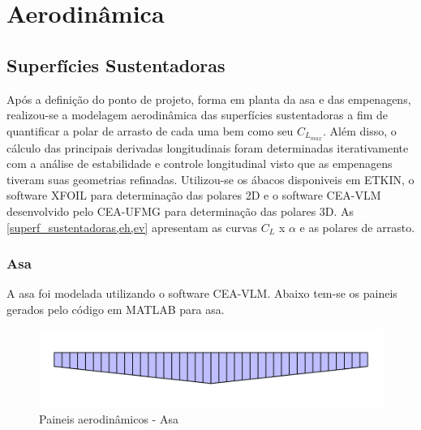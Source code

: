 \chapter{Aerodinâmica}




\section{Superfícies Sustentadoras}
\label{superf_sustentadoras}

Após a definição do ponto de projeto, forma em planta da asa e das empenagens, realizou-se a modelagem aerodinâmica das superfícies sustentadoras a fim de quantificar a polar de arrasto de cada uma bem como seu $C_{L_{max}}$. Além disso, o cálculo das principais derivadas longitudinais foram determinadas iterativamente com a análise de estabilidade e controle longitudinal visto que as empenagens tiveram suas geometrias refinadas. Utilizou-se os ábacos disponiveis em ETKIN, o software XFOIL para determinação das polares 2D e o software CEA-VLM desenvolvido pelo CEA-UFMG para determinação das polares 3D. As \autoref{superf_sustentadoras,eh,ev} apresentam as curvas $C_L$ x $\alpha$ e as polares de arrasto.

\subsection{Asa}
\label{asa}
A asa foi modelada utilizando o software CEA-VLM. Abaixo tem-se os paineis gerados pelo código em MATLAB para asa.

\begin{figure}[H]
\centering
\includegraphics[width=1\textwidth]{images/parte3/malha_asa.PNG}
\caption[Paineis aerodinâmicos - Asa]{Paineis aerodinâmicos - Asa}
\label{fig:malha_asa}
\end{figure}

